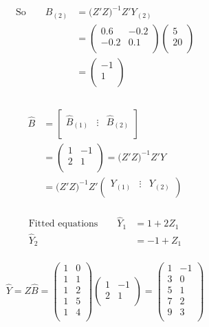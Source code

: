 \documentclass[11pt,a4paper]{article}
\theoremstyle{definition}
\begin{document}
\begin{align*}
\text{So}\qquad  \widehat{B}_{(2)} & = \big(Z'Z\big)^{-1}Z'Y_{(2)}\\
& = \begin{pmatrix}
0.6 & -0.2\\
-0.2 & 0.1\\
\end{pmatrix}
\begin{pmatrix}
5\\ 20\\
\end{pmatrix}\\
& = 
\begin{pmatrix}
-1\\ 1\\
\end{pmatrix}\\\\
\end{align*}




\begin{align*}
\widehat{B} & = \begin{bmatrix}
\widehat{B}_{(1)} & \vdots & \widehat{B}_{(2)}\\
\end{bmatrix}\\
& = 
\begin{pmatrix}
1 & -1\\
2 & 1\\
\end{pmatrix}
=\big(Z'Z\big)^{-1}Z'Y\\
& = \big(Z'Z\big)^{-1}Z'
\begin{pmatrix}
Y_{(1)} & \vdots & Y_{(2)}\\
\end{pmatrix}\\
\end{align*}


\begin{align*}
\text{Fitted equations}\qquad  \widehat{Y}_1 & = 1 + 2Z_1\\
                                    \widehat{Y}_2 & = -1 + Z_1\\
\end{align*}




$$\widehat{Y}=Z\widehat{B}=
\begin{pmatrix}
1 & 0\\
1 & 1\\
1 & 2\\
1 & 5\\
1 & 4\\
\end{pmatrix}
\begin{pmatrix}
1 & -1\\
2 & 1\\
\end{pmatrix}
=\begin{pmatrix}
1 & -1\\
3 & 0\\
5 & 1\\
7 & 2\\
9 & 3\\
\end{pmatrix}
$$\\
\end{document}
